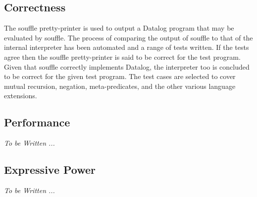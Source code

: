 \subsection{Correctness}
The souffle pretty-printer is used to output a Datalog program that may be evaluated by souffle. The process of comparing the output of souffle to that of the internal interpreter has been automated and a range of tests written. If the tests agree then the souffle pretty-printer is said to be correct for the test program. Given that souffle correctly implements Datalog, the interpreter too is concluded to be correct for the given test program. The test cases are selected to cover mutual recursion, negation, meta-predicates, and the other various language extensions.

\subsection{Performance}
\textit{To be Written ... }

\subsection{Expressive Power}
\textit{To be Written ... }